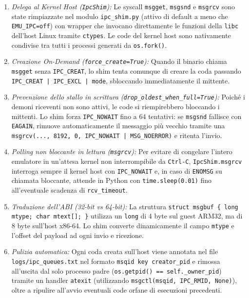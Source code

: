 \documentclass[11pt,a4paper]{article}
\begin{document}
\begin{itemize}
\begin{enumerate}
        \item \textit{Delega al Kernel Host (\texttt{IpcShim}):} Le syscall \texttt{msgget}, \texttt{msgsnd} e \texttt{msgrcv} sono state rimpiazzate nel modulo \texttt{ipc\_shim.py} (attivo di default a meno che \texttt{EMU\_IPC=off}) con wrapper che invocano direttamente le funzioni della \texttt{libc} dell'host Linux tramite \texttt{ctypes}. Le code del kernel host sono nativamente condivise tra tutti i processi generati da \texttt{os.fork()}.
        \item \textit{Creazione On-Demand (\texttt{force\_create=True}):} Quando il binario chiama \texttt{msgget} senza \texttt{IPC\_CREAT}, lo shim tenta comunque di creare la coda passando \texttt{IPC\_CREAT | IPC\_EXCL | mode}, sbloccando immediatamente il mittente.
        \item \textit{Prevenzione dello stallo in scrittura (\texttt{drop\_oldest\_when\_full=True}):} Poiché i demoni riceventi non sono attivi, le code si riempirebbero bloccando i mittenti. Lo shim forza \texttt{IPC\_NOWAIT} fino a 64 tentativi: se \texttt{msgsnd} fallisce con \texttt{EAGAIN}, rimuove automaticamente il messaggio più vecchio tramite una \texttt{msgrcv(..., 8192, 0, IPC\_NOWAIT | MSG\_NOERROR)} e ritenta l'invio.
        \item \textit{Polling non bloccante in lettura (\texttt{msgrcv}):} Per evitare di congelare l'intero emulatore in un'attesa kernel non interrompibile da \texttt{Ctrl-C}, \texttt{IpcShim.msgrcv} interroga sempre il kernel host con \texttt{IPC\_NOWAIT} e, in caso di \texttt{ENOMSG} su chiamata bloccante, attende in Python con \texttt{time.sleep(0.01)} fino all'eventuale scadenza di \texttt{rcv\_timeout}.
        \item \textit{Traduzione dell'ABI (32-bit vs 64-bit):} La struttura \texttt{struct msgbuf \{ long mtype; char mtext[]; \}} utilizza un \texttt{long} di 4 byte sul guest ARM32, ma di 8 byte sull'host x86-64. Lo shim converte dinamicamente il campo \texttt{mtype} e l'offset del payload ad ogni invio e ricezione.
        \item \textit{Pulizia automatica:} Ogni coda creata sull'host viene annotata nel file \texttt{logs/ipc\_queues.txt} nel formato \texttt{msqid key creator\_pid} e rimossa all'uscita dal solo processo padre (\texttt{os.getpid() == self.\_owner\_pid}) tramite un handler \texttt{atexit} (utilizzando \texttt{msgctl(msqid, IPC\_RMID, None)}), oltre a ripulire all'avvio eventuali code orfane di esecuzioni precedenti.
    \end{enumerate}
\end{itemize}
\end{document}
